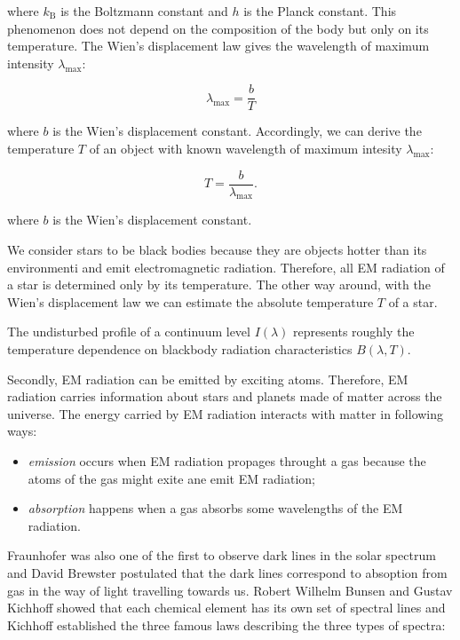 where \(k_{\mathrm{B}}\) is the Boltzmann constant 
and \(h\) is the Planck constant.
This phenomenon does not depend on the composition of the body
but only on its temperature.
The Wien's displacement law gives the wavelength of maximum intensity \(\lambda_{\max}\):

\begin{equation}
	\lambda_{\max} = \frac{b}{T}
\end{equation}

where \(b\) is the Wien's displacement constant.
Accordingly, we can derive the temperature \(T\) of an object
with known wavelength of maximum intesity \(\lambda_{\max}\):

\begin{equation}
	T = \frac{b}{\lambda_{\max}}.
\end{equation}

where \(b\) is the Wien's displacement constant.~\cite{cochard2018}

We consider stars to be black bodies
because they are objects hotter than its environmenti
and emit electromagnetic radiation.
Therefore, all EM radiation of a star is determined only by its temperature.
The other way around, with the Wien's displacement law
we can estimate the absolute temperature \(T\) of a star.~\cite{trypsteen2017}

The undisturbed profile of a continuum level \(I(\lambda)\)
represents roughly the temperature dependence on
blackbody radiation characteristics \(B(\lambda, T)\).


Secondly, EM radiation can be emitted by exciting atoms.
Therefore, EM radiation carries information about stars and planets
made of matter across the universe.
The energy carried by EM radiation interacts with matter in following ways:

\begin{itemize}
	\item \textit{emission} occurs when EM radiation propages throught a gas
		because the atoms of the gas might exite ane emit EM radiation;
	\item \textit{absorption} happens when a gas absorbs some wavelengths
		of the EM radiation.
\end{itemize}

Fraunhofer was also one of the first to observe dark lines in the solar spectrum
and David Brewster postulated that the dark lines correspond to absoption from gas in the way of light travelling towards us.
Robert Wilhelm Bunsen and Gustav Kichhoff showed that each chemical element has its own set of spectral lines
and Kichhoff established the three famous laws describing the three types of spectra:


